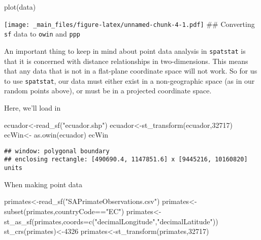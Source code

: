 \documentclass[
]{book}
\newenvironment{Shaded}{\begin{snugshade}}{\end{snugshade}}
\newcommand{\AttributeTok}[1]{\textcolor[rgb]{0.77,0.63,0.00}{#1}}
\newcommand{\DecValTok}[1]{\textcolor[rgb]{0.00,0.00,0.81}{#1}}
\newcommand{\FunctionTok}[1]{\textcolor[rgb]{0.00,0.00,0.00}{#1}}
\newcommand{\NormalTok}[1]{#1}
\newcommand{\OtherTok}[1]{\textcolor[rgb]{0.56,0.35,0.01}{#1}}
\newcommand{\SpecialCharTok}[1]{\textcolor[rgb]{0.00,0.00,0.00}{#1}}
\newcommand{\StringTok}[1]{\textcolor[rgb]{0.31,0.60,0.02}{#1}}
\begin{document}
\begin{Shaded}
\begin{Highlighting}[]
\FunctionTok{plot}\NormalTok{(data)}
\end{Highlighting}
\end{Shaded}

\texttt{[image: \_main\_files/figure-latex/unnamed-chunk-4-1.pdf]}
\#\# Converting \texttt{sf} data to \texttt{owin} and \texttt{ppp}

An important thing to keep in mind about point data analysis in \texttt{spatstat} is that it is concerned with distance relationships in two-dimensions. This means that any data that is not in a flat-plane coordinate space will not work. So for us to use \texttt{spatstat}, our data must either exist in a non-geographic space (as in our random points above), or must be in a projected coordinate space.

Here, we'll load in

\begin{Shaded}
\begin{Highlighting}[]
\NormalTok{ecuador}\OtherTok{\textless{}{-}}\FunctionTok{read\_sf}\NormalTok{(}\StringTok{"ecuador.shp"}\NormalTok{)}
\NormalTok{ecuador}\OtherTok{\textless{}{-}}\FunctionTok{st\_transform}\NormalTok{(ecuador,}\DecValTok{32717}\NormalTok{)}
\NormalTok{ecWin}\OtherTok{\textless{}{-}} \FunctionTok{as.owin}\NormalTok{(ecuador)}
\NormalTok{ecWin}
\end{Highlighting}
\end{Shaded}

\begin{verbatim}
## window: polygonal boundary
## enclosing rectangle: [490690.4, 1147851.6] x [9445216, 10160820] units
\end{verbatim}

When making point data

\begin{Shaded}
\begin{Highlighting}[]
\NormalTok{primates}\OtherTok{\textless{}{-}}\FunctionTok{read\_sf}\NormalTok{(}\StringTok{"SAPrimateObservations.csv"}\NormalTok{)}
\NormalTok{primates}\OtherTok{\textless{}{-}}\FunctionTok{subset}\NormalTok{(primates,countryCode}\SpecialCharTok{==}\StringTok{"EC"}\NormalTok{)}
\NormalTok{primates}\OtherTok{\textless{}{-}}\FunctionTok{st\_as\_sf}\NormalTok{(primates,}\AttributeTok{coords=}\FunctionTok{c}\NormalTok{(}\StringTok{"decimalLongitude"}\NormalTok{,}\StringTok{"decimalLatitude"}\NormalTok{))}
\FunctionTok{st\_crs}\NormalTok{(primates)}\OtherTok{\textless{}{-}}\DecValTok{4326}
\NormalTok{primates}\OtherTok{\textless{}{-}}\FunctionTok{st\_transform}\NormalTok{(primates,}\DecValTok{32717}\NormalTok{)}
\end{Highlighting}
\end{Shaded}
\end{document}
